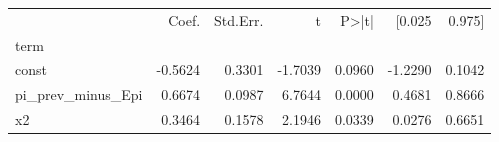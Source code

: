 \begin{tabular}{lrrrrrr}
\toprule
 & Coef. & Std.Err. & t & P>|t| & [0.025 & 0.975] \\
term &  &  &  &  &  &  \\
\midrule
const & -0.5624 & 0.3301 & -1.7039 & 0.0960 & -1.2290 & 0.1042 \\
pi_prev_minus_Epi & 0.6674 & 0.0987 & 6.7644 & 0.0000 & 0.4681 & 0.8666 \\
x2 & 0.3464 & 0.1578 & 2.1946 & 0.0339 & 0.0276 & 0.6651 \\
\bottomrule
\end{tabular}
